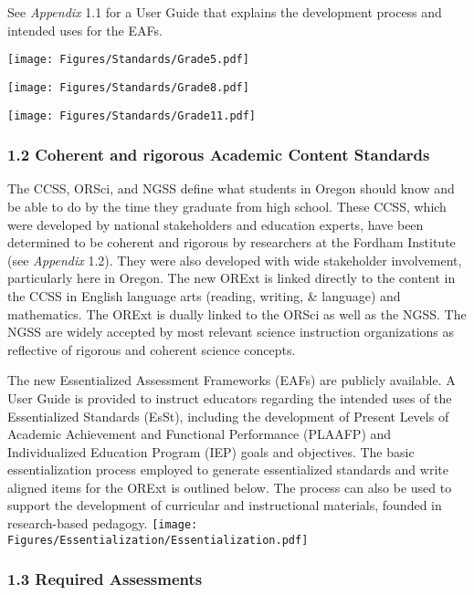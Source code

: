 \documentclass[]{article}
\begin{document}
See \emph{Appendix} 1.1 for a User Guide that explains the development
process and intended uses for the EAFs.

\FloatBarrier

\texttt{[image: Figures/Standards/Grade5.pdf]}

\texttt{[image: Figures/Standards/Grade8.pdf]}

\texttt{[image: Figures/Standards/Grade11.pdf]}

\clearpage

\hypertarget{coherent-and-rigorous-academic-content-standards}{%
\subsubsection{1.2 Coherent and rigorous Academic Content
Standards}\label{coherent-and-rigorous-academic-content-standards}}

The CCSS, ORSci, and NGSS define what students in Oregon should know and
be able to do by the time they graduate from high school. These CCSS,
which were developed by national stakeholders and education experts,
have been determined to be coherent and rigorous by researchers at the
Fordham Institute (see \emph{Appendix} 1.2). They were also developed
with wide stakeholder involvement, particularly here in Oregon. The new
ORExt is linked directly to the content in the CCSS in English language
arts (reading, writing, \& language) and mathematics. The ORExt is
dually linked to the ORSci as well as the NGSS. The NGSS are widely
accepted by most relevant science instruction organizations as
reflective of rigorous and coherent science concepts.

The new Essentialized Assessment Frameworks (EAFs) are publicly
available. A User Guide is provided to instruct educators regarding the
intended uses of the Essentialized Standards (EsSt), including the
development of Present Levels of Academic Achievement and Functional
Performance (PLAAFP) and Individualized Education Program (IEP) goals
and objectives. The basic essentialization process employed to generate
essentialized standards and write aligned items for the ORExt is
outlined below. The process can also be used to support the development
of curricular and instructional materials, founded in research-based
pedagogy. \FloatBarrier
\texttt{[image: Figures/Essentialization/Essentialization.pdf]} \newpage

\hypertarget{required-assessments}{%
\subsubsection{1.3 Required Assessments}\label{required-assessments}}
\end{document}
